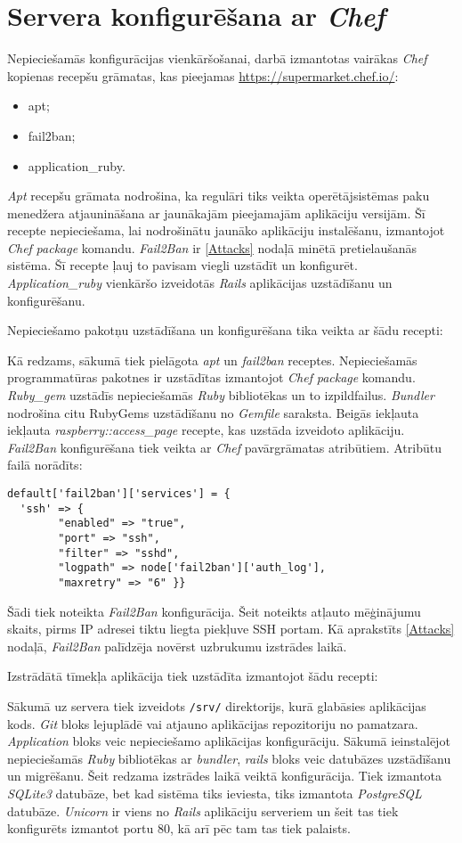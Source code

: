 \section{Servera konfigurēšana ar \textit{Chef}}
Nepieciešamās konfigurācijas vienkāršošanai, darbā izmantotas vairākas \textit{Chef} kopienas recepšu grāmatas, kas pieejamas \url{https://supermarket.chef.io/}:
\begin{itemize}
	\item apt;
	\item fail2ban;
	\item application_ruby.
\end{itemize}
\textit{Apt} recepšu grāmata nodrošina, ka regulāri tiks veikta operētājsistēmas paku menedžera atjaunināšana ar jaunākajām pieejamajām aplikāciju versijām. Šī recepte nepieciešama, lai nodrošinātu jaunāko aplikāciju instalēšanu, izmantojot \textit{Chef} \textit{package} komandu.
\textit{Fail2Ban} ir \ref{Attacks} nodaļā minētā pretielaušanās sistēma. Šī recepte ļauj to pavisam viegli uzstādīt un konfigurēt.
\textit{Application_ruby} vienkāršo izveidotās \textit{Rails} aplikācijas uzstādīšanu un konfigurēšanu.

Nepieciešamo pakotņu uzstādīšana un konfigurēšana tika veikta ar šādu recepti:

Kā redzams, sākumā tiek pielāgota \textit{apt} un \textit{fail2ban} receptes. Nepieciešamās programmatūras pakotnes ir uzstādītas izmantojot \textit{Chef} \textit{package} komandu. \textit{Ruby_gem} uzstādīs nepieciešamās \textit{Ruby} bibliotēkas un to izpildfailus. \textit{Bundler} nodrošina citu RubyGems uzstādīšanu no \textit{Gemfile} saraksta.
Beigās iekļauta iekļauta \textit{raspberry::access_page} recepte, kas uzstāda izveidoto aplikāciju. \textit{Fail2Ban} konfigurēšana tiek veikta ar \textit{Chef} pavārgrāmatas atribūtiem. Atribūtu failā norādīts:
\begin{lstlisting}
default['fail2ban']['services'] = {
  'ssh' => {
        "enabled" => "true",
        "port" => "ssh",
        "filter" => "sshd",
        "logpath" => node['fail2ban']['auth_log'],
        "maxretry" => "6" }}
\end{lstlisting}
Šādi tiek noteikta \textit{Fail2Ban} konfigurācija. Šeit noteikts atļauto mēģinājumu skaits, pirms IP adresei tiktu liegta piekļuve SSH portam. Kā aprakstīts \ref{Attacks} nodaļā, \textit{Fail2Ban} palīdzēja novērst uzbrukumu izstrādes laikā.

Izstrādātā tīmekļa aplikācija tiek uzstādīta izmantojot šādu recepti:

Sākumā uz servera tiek izveidots \texttt{/srv/} direktorijs, kurā glabāsies aplikācijas kods. \textit{Git} bloks lejuplādē vai atjauno aplikācijas repozitoriju no pamatzara. \textit{Application} bloks veic nepieciešamo aplikācijas konfigurāciju. Sākumā ieinstalējot nepieciešamās \textit{Ruby} bibliotēkas ar \textit{bundler}, \textit{rails} bloks veic datubāzes uzstādīšanu un migrēšanu. Šeit redzama izstrādes laikā veiktā konfigurācija. Tiek izmantota \textit{SQLite3} datubāze, bet kad sistēma tiks ieviesta, tiks izmantota \textit{PostgreSQL} datubāze. \textit{Unicorn} ir viens no \textit{Rails} aplikāciju serveriem un šeit tas tiek konfigurēts izmantot portu 80, kā arī pēc tam tas tiek palaists.

